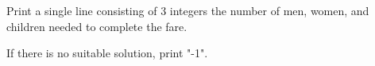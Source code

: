 Print a single line consisting of 3 integers the number of men, women, and children needed to complete the fare.


If there is no suitable solution, print "-1".